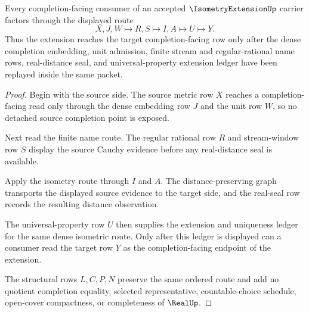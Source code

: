 \begin{theorem}
\label{thm:isometry-extension-completion-handoff}
Every completion-facing consumer of an accepted $\IsometryExtensionUp$ carrier factors through the displayed route
$$
X,J,W\longmapsto R,S\longmapsto I,A\longmapsto U\longmapsto Y .
$$
Thus the extension reaches the target completion-facing row only after the dense completion embedding, unit admission, finite stream and regular-rational name rows, real-distance seal, and universal-property extension ledger have been replayed inside the same packet.
\end{theorem}
\begin{proof}
Begin with the source side. The source metric row $X$ reaches a completion-facing read only through the dense embedding row $J$ and the unit row $W$, so no detached source completion point is exposed.

Next read the finite name route. The regular rational row $R$ and stream-window row $S$ display the source Cauchy evidence before any real-distance seal is available.

Apply the isometry route through $I$ and $A$. The distance-preserving graph transports the displayed source evidence to the target side, and the real-seal row records the resulting distance observation.

The universal-property row $U$ then supplies the extension and uniqueness ledger for the same dense isometric route. Only after this ledger is displayed can a consumer read the target row $Y$ as the completion-facing endpoint of the extension.

The structural rows $L,C,P,N$ preserve the same ordered route and add no quotient completion equality, selected representative, countable-choice schedule, open-cover compactness, or completeness of $\RealUp$.
\end{proof}

